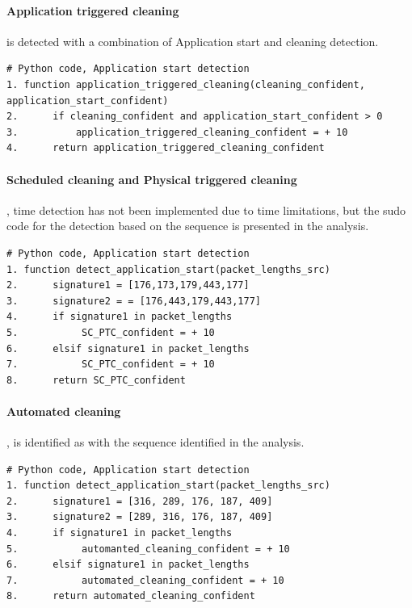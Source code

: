 \paragraph{Application triggered cleaning} is detected with a combination of Application start and cleaning detection.
\begin{lstlisting}
# Python code, Application start detection
1. function application_triggered_cleaning(cleaning_confident, application_start_confident)
2.      if cleaning_confident and application_start_confident > 0
3.          application_triggered_cleaning_confident = + 10
4.      return application_triggered_cleaning_confident
\end{lstlisting}

\paragraph{Scheduled cleaning and Physical triggered cleaning}, time detection has not been implemented due to time limitations, but the sudo code for the detection based on the sequence is presented in the analysis. 
\begin{lstlisting}
# Python code, Application start detection
1. function detect_application_start(packet_lengths_src)
2.      signature1 = [176,173,179,443,177]
3.      signature2 = = [176,443,179,443,177]
4.      if signature1 in packet_lengths
5.           SC_PTC_confident = + 10
6.      elsif signature1 in packet_lengths
7.           SC_PTC_confident = + 10
8.      return SC_PTC_confident
\end{lstlisting}

\paragraph{Automated cleaning}, is identified as with the sequence identified in the analysis. 
\begin{lstlisting}
# Python code, Application start detection
1. function detect_application_start(packet_lengths_src)
2.      signature1 = [316, 289, 176, 187, 409]
3.      signature2 = [289, 316, 176, 187, 409]
4.      if signature1 in packet_lengths
5.           automanted_cleaning_confident = + 10
6.      elsif signature1 in packet_lengths
7.           automated_cleaning_confident = + 10
8.      return automated_cleaning_confident
\end{lstlisting}

